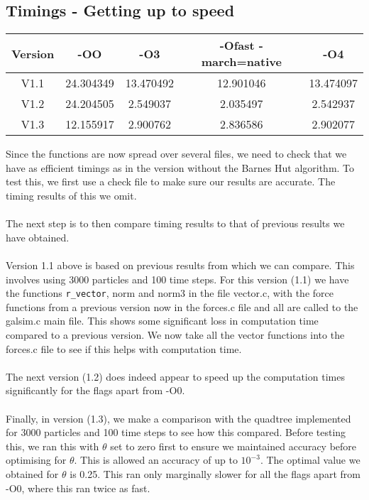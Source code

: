 \documentclass{article}
\begin{document}
\subsection{Timings - Getting up to speed}
\begin{center}
\begin{tabular}{|c|c|c|c|c|}
\hline
Version & -OO & -O3 & -Ofast -march=native & -O4\\
\hline
V1.1 & 24.304349 & 13.470492 & 12.901046 & 13.474097\\
V1.2 & 24.204505 & 2.549037 & 2.035497 & 2.542937\\
V1.3 & 12.155917 & 2.900762 & 2.836586 & 2.902077\\
\hline
\end{tabular}
\end{center}
Since the functions are now spread over several files, we need to check that we have as efficient timings as in the version without the Barnes Hut algorithm. To test this, we first use a check file to make sure our results are accurate. The timing results of this we omit.
\\\\
The next step is to then compare timing results to that of previous results we have obtained. 
\\\\
Version 1.1 above is based on previous results from which we can compare. This involves using 3000 particles and 100 time steps. For this version (1.1) we have the functions \verb|r_vector|, norm and norm3 in the file vector.c, with the force functions from a previous version now in the forces.c file and all are called to the galsim.c main file. This shows some significant loss in computation time compared to a previous version. We now take all the vector functions into the forces.c file to see if this helps with computation time.
\\\\
The next version (1.2) does indeed appear to speed up the computation times significantly for the flags apart from -O0. 
\\\\
Finally, in version (1.3), we make a comparison with the quadtree implemented for 3000 particles and 100 time steps to see how this compared. Before testing this, we ran this with $\theta$ set to zero first to ensure we maintained accuracy before optimising for $\theta$. This is allowed an accuracy of up to $10^{-3}$. The optimal value we obtained for $\theta$ is 0.25. This ran only marginally slower for all the flags apart from -O0, where this ran twice as fast. 
\end{document}
